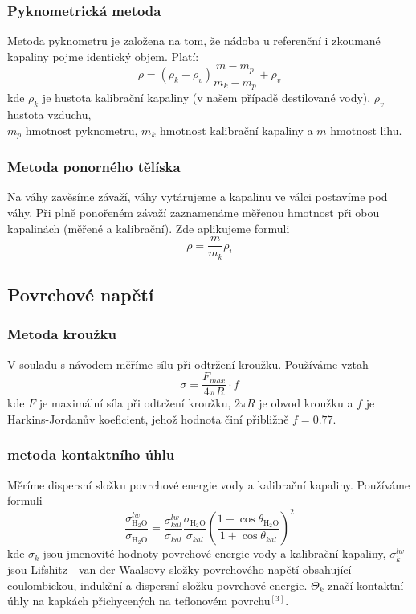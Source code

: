 \documentclass[czech,11pt,a4paper]{article}
\begin{document}
	\subsubsection{Pyknometrická metoda}
	Metoda pyknometru je založena na tom, že nádoba u referenční i zkoumané kapaliny pojme identický objem. Platí:
	\begin{equation}
		\rho = (\rho_k - \rho_v) \frac{ m - m_p}{m_k - m_p} + \rho_v
	\end{equation}
	kde $\rho_k$ je hustota kalibrační kapaliny (v našem případě destilované vody), $\rho_v$ hustota vzduchu,\\ $m_p$ hmotnost pyknometru, $m_k$ hmotnost kalibrační kapaliny a $m$ hmotnost lihu. 
	\subsubsection{Metoda ponorného tělíska}
	Na váhy zavěsíme závaží, váhy vytárujeme a kapalinu ve válci postavíme pod váhy. Při plně ponořeném závaží zaznamenáme měřenou hmotnost při obou kapalinách (měřené a kalibrační). 
	Zde aplikujeme formuli
	\begin{equation}
		\rho = \frac{m}{m_k} \rho_i
	\end{equation}
	\subsection{Povrchové napětí}
	\subsubsection{Metoda kroužku}
	V souladu s návodem měříme sílu při odtržení kroužku. Používáme vztah
	\begin{equation}
		\sigma = \frac{F_{max}}{4\pi R} \cdot f
	\end{equation}
	kde $F$ je maximální síla při odtržení kroužku, $2\pi R$ je obvod kroužku a $f$ je Harkins-Jordanův koeficient, jehož hodnota činí přibližně $f = 0.77$.
	\subsubsection{metoda kontaktního úhlu}
	Měríme dispersní složku povrchové energie vody a kalibrační kapaliny. Používáme formuli
	\begin{equation}
		\frac{\sigma_{\mathrm{H}_2 \mathrm{O}}^{l w}}{\sigma_{\mathrm{H}_2 \mathrm{O}}}=\frac{\sigma_{k a l}^{l w}}{\sigma_{k a l}} \frac{\sigma_{\mathrm{H}_2 \mathrm{O}}}{\sigma_{k a l}}\left(\frac{1+\cos \theta_{\mathrm{H}_2 \mathrm{O}}}{1+\cos \theta_{k a l}}\right)^2
	\end{equation}
	kde $\sigma_k$ jsou jmenovité hodnoty povrchové energie vody a kalibrační kapaliny, $\sigma ^{lw}_k$ jsou Lifshitz - van der Waalsovy složky povrchového napětí obsahující coulombickou, indukční a dispersní složku povrchové energie. $\Theta_k $ značí kontaktní úhly na kapkách přichycených na teflonovém povrchu$^{[3]}$.
\end{document}

